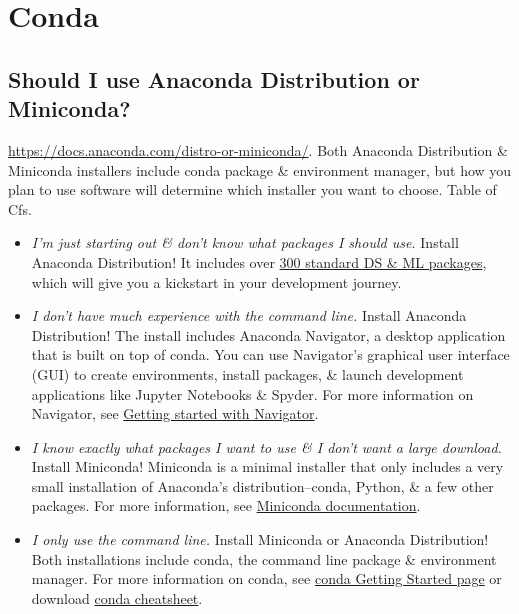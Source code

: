 \documentclass{article}
\begin{document}

\section{Conda}

\subsection{Should I use Anaconda Distribution or Miniconda?}
\url{https://docs.anaconda.com/distro-or-miniconda/}. Both Anaconda Distribution \& Miniconda installers include conda package \& environment manager, but how you plan to use software will determine which installer you want to choose. {\sf Table of Cfs.}

\begin{itemize}
	\item {\it I'm just starting out \& don't know what packages I should use.} Install Anaconda Distribution! It includes over \href{https://docs.anaconda.com/anaconda/release-notes/}{300 standard DS \& ML packages}, which will give you a kickstart in your development journey.
	\item {\it I don't have much experience with the command line.} Install Anaconda Distribution! The install includes Anaconda Navigator, a desktop application that is built on top of conda. You can use Navigator's graphical user interface (GUI) to create environments, install packages, \& launch development applications like Jupyter Notebooks \& Spyder. For more information on Navigator, see \href{https://docs.anaconda.com/navigator/getting-started/}{Getting started with Navigator}.
	\item {\it I know exactly what packages I want to use \& I don't want a large download.} Install Miniconda! Miniconda is a minimal installer that only includes a very small installation of Anaconda's distribution--conda, Python, \& a few other packages. For more information, see \href{https://docs.anaconda.com/miniconda/}{Miniconda documentation}.
	\item {\it I only use the command line.} Install Miniconda or Anaconda Distribution! Both installations include conda, the command line package \& environment manager. For more information on conda, see \href{https://conda.io/projects/conda/en/latest/user-guide/getting-started.html}{conda Getting Started page} or download \href{https://docs.conda.io/projects/conda/en/latest/user-guide/cheatsheet.html}{conda cheatsheet}.
\end{itemize}
\end{document}

